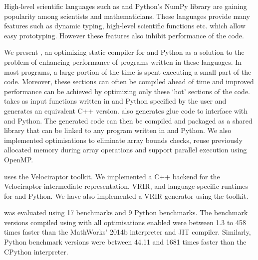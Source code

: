 High-level scientific languages such as \matlab and Python's NumPy 
library are gaining popularity among scientists and 
mathematicians. These languages provide many features such as dynamic typing, 
high-level scientific functions etc. which allow easy 
prototyping. However these features also inhibit performance of the code. 

We present \velocty, an optimizing static compiler for \matlab and Python as a 
solution to the problem of enhancing performance of programs written in these 
languages. In most programs, a large portion of the time is spent executing a 
small part of the code. Moreover, these sections can often be compiled ahead of 
time and improved performance can be achieved by optimizing only these `hot' 
sections of the code. \velocty takes as input functions written in \matlab and 
Python specified by the user and generates an equivalent C++ version. \velocty also generates glue code to interface with \matlab and Python. The generated code can then be compiled and packaged as 
a shared library that can be linked to any program written in \matlab and 
Python. We also implemented optimisations to eliminate array bounds checks, 
reuse previously allocated memory during array operations and support parallel execution using OpenMP. 

\velocty uses the Velociraptor toolkit. We implemented a C++ backend for the 
Velociraptor intermediate representation, VRIR, and language-specific runtimes 
for \matlab and Python. We have also implemented a \matlab VRIR generator using the \mclab toolkit. 

\velocty was evaluated using 17 \matlab benchmarks and 9 Python benchmarks. The \matlab benchmark versions 
compiled using \velocty with all optimisations enabled were between 1.3 to 458 times faster than the MathWorks' 
\matlab2014b interpreter and JIT compiler. Similarly, Python benchmark versions were between 44.11 and 1681 times faster than the CPython interpreter.
